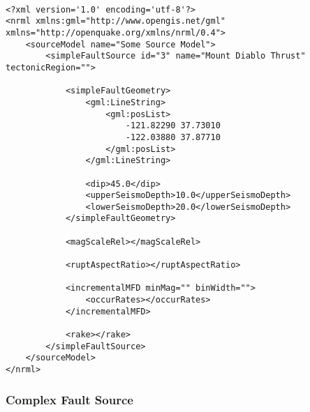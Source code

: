 \begin{Verbatim}[frame=single, commandchars=\\\{\}, fontsize=\scriptsize]

<?xml version='1.0' encoding='utf-8'?>
<nrml xmlns:gml="http://www.opengis.net/gml" xmlns="http://openquake.org/xmlns/nrml/0.4">
    <sourceModel name="Some Source Model">
        <simpleFaultSource id="3" name="Mount Diablo Thrust" tectonicRegion="">

            <simpleFaultGeometry>
                <gml:LineString>
                    <gml:posList>
                        -121.82290 37.73010
                        -122.03880 37.87710
                    </gml:posList>
                </gml:LineString>

                <dip>45.0</dip>
                <upperSeismoDepth>10.0</upperSeismoDepth>
                <lowerSeismoDepth>20.0</lowerSeismoDepth>
            </simpleFaultGeometry>

            <magScaleRel></magScaleRel>

            <ruptAspectRatio></ruptAspectRatio>

            <incrementalMFD minMag="" binWidth="">
                <occurRates></occurRates>
            </incrementalMFD>

            <rake></rake>
        </simpleFaultSource>
    </sourceModel>
</nrml>

\end{Verbatim}


\subsubsection{Complex Fault Source}

